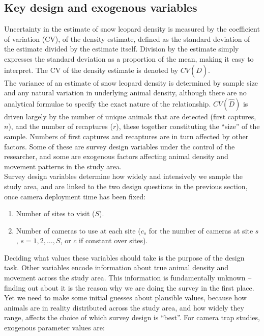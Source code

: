 \documentclass[a4paper,11pt, draft]{article} %
\begin{document}
\subsection{Key design and exogenous variables} \label{s:vars}
Uncertainty in the estimate of snow leopard density is measured by the coefficient of variation (CV), of the density estimate, defined as the standard deviation of the estimate divided by the estimate itself. Division by the estimate simply expresses the standard deviation as a proportion of the mean, making it easy to interpret. The CV of the density estimate is denoted by $CV(\hat{D})$.
\\[1em]
The variance of an estimate of snow leopard density is determined by sample size and any natural variation in underlying animal density, although there are no analytical formulae to specify the exact nature of the relationship. $CV(\hat{D})$ is driven largely by the number of unique animals that are detected (first captures, $n$), and the number of recaptures ($r$), these together constituting the ``size'' of the sample. Numbers of first captures and recaptures are in turn affected by other factors. Some of these are survey design variables under the control of the researcher, and some are exogenous factors affecting animal density and movement patterns in the study area. 
\\[1em]
Survey design variables determine how widely and intensively we sample the study area, and are linked to the two design questions in the previous section, once camera deployment time has been fixed:
\begin{enumerate}
\item Number of sites to visit ($S$).
\item Number of cameras to use at each site ($c_s$ for the number of cameras at site $s$, $s=1,2,\dots,S$, or $c$ if constant over sites).   
\end{enumerate}
Deciding what values these variables should take is the purpose of the design task. Other variables encode information about true animal density and movement across the study area. This information is fundamentally unknown -- finding out about it is the reason why we are doing the survey in the first place. Yet we need to make some initial guesses about plausible values, because how animals are in reality distributed across the study area, and how widely they range, affects the choice of which survey design is ``best''. For camera trap studies, exogenous parameter values are:
\end{document}
